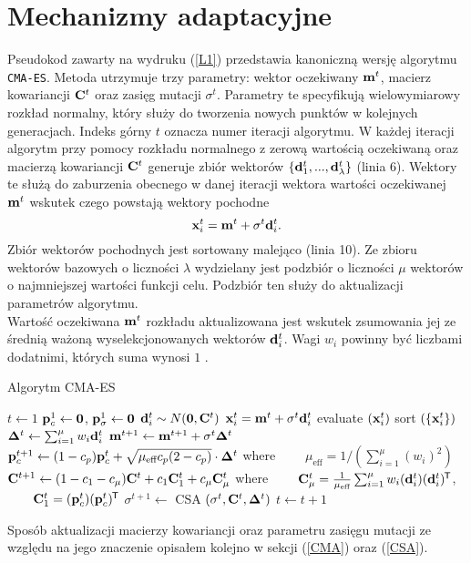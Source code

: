 \section{Mechanizmy adaptacyjne}
\label{section:adaptacje}
Pseudokod zawarty na wydruku (\ref{L1}) przedstawia kanoniczną wersję algorytmu \texttt{CMA-ES}. Metoda utrzymuje trzy parametry: wektor oczekiwany ${\bf m}^{t}$, macierz kowariancji
${\bf C}^t$ oraz zasięg mutacji $\sigma^t$. Parametry te specyfikują wielowymiarowy rozkład normalny, który służy do tworzenia nowych punktów w kolejnych generacjach. Indeks górny $t$ oznacza numer iteracji algorytmu.
W każdej iteracji algorytm przy pomocy rozkładu normalnego z zerową wartością oczekiwaną oraz macierzą kowariancji ${\bf C}^t$ generuje zbiór wektorów $\{{\bf d}_1^t,...,{\bf d}_\lambda^t\}$ (linia 6). 
Wektory te służą do zaburzenia obecnego w danej iteracji wektora wartości oczekiwanej ${\bf m}^t$ wskutek czego powstają wektory pochodne
\begin{equation}
    {\bf x}^t_i={\bf m}^t+\sigma^t {\bf d}_i^t.
\end{equation}
Zbiór wektorów pochodnych jest sortowany malejąco (linia 10). Ze zbioru wektorów bazowych o liczności $\lambda$ wydzielany jest podzbiór o liczności $\mu$ wektorów o najmniejszej wartości funkcji celu. Podzbiór ten służy do
aktualizacji parametrów algorytmu. \\
Wartość oczekiwana ${\bf m}^t$ rozkładu aktualizowana jest wskutek zsumowania jej ze średnią ważoną wyselekcjonowanych wektorów ${\bf d}_{i}^{t}$. Wagi $w_{i}$ powinny być liczbami dodatnimi, których suma wynosi $1$ \cite{HansenOstermeier01}.

\begin{algorithm}[h]
  \renewcommand{\thealgorithm}{}
  \caption{Algorytm CMA-ES\label{L1}} 
  \begin{algorithmic}[1]
  \State $t \gets 1$
\State ${\bf p}_c^1 \gets {\bf 0}$, ${\bf p}_\sigma^1 \gets {\bf 0}$
      \State $ {\bf d}_i^t \sim N({\bf 0}, {\bf C}^t) $
      \State ${\bf x}_i^t={\bf m}^{t} + \sigma^t {\bf d}_i^t $
      \State evaluate $({\bf x}_i^t)$
   \EndFor
   \State sort $ \left(\{ {\bf x}_i^t \} \right) $
   \State ${\bf \Delta}^{t} \gets \sum_{i=1}^\mu w_i {\bf d}_i^t $
   \State ${\bf m}^{t+1} \gets {\bf m}^{t+1} + \sigma^t {\bf \Delta}^{t} $
   \State ${\bf p}_c^{t+1} \gets (1-c_p){\bf p}_c^t + \sqrt{\mu_\text{eff} c_p(2-c_p)} \cdot {\bf \Delta}^{t}$ where \newline
          $\qquad \mu_\text{eff}=1/\left(\sum_{i=1}^\mu (w_i)^2\right)$
   \State ${\bf C}^{t+1} \gets (1-c_1-c_\mu){\bf C}^t + c_1 {\bf C}^t_1 + c_\mu  {\bf C}^t_\mu$ where \newline
$\qquad {\bf C}_\mu^t=\frac{1}{\mu_\text{eff}}\sum_{i=1}^\mu w_i({\bf d}_i^t)({\bf d}_i^t)^{\mkern-1.5mu\mathsf{T}}$, \newline
$\qquad {\bf C}_1^t=({\bf p}_c^t)({\bf p}_c^t)^{\mkern-1.5mu\mathsf{T}}$
   \State $\sigma^{t+1} \gets $ CSA $(\sigma^t, {\bf C}^{t}, {\bf \Delta}^{t})$ 
   \State $t \gets t+1$
\EndWhile
\end{algorithmic}
\end{algorithm}
Sposób aktualizacji macierzy kowariancji oraz parametru zasięgu mutacji ze względu na jego znaczenie opisałem kolejno w sekcji (\ref{CMA}) oraz (\ref{CSA}).
